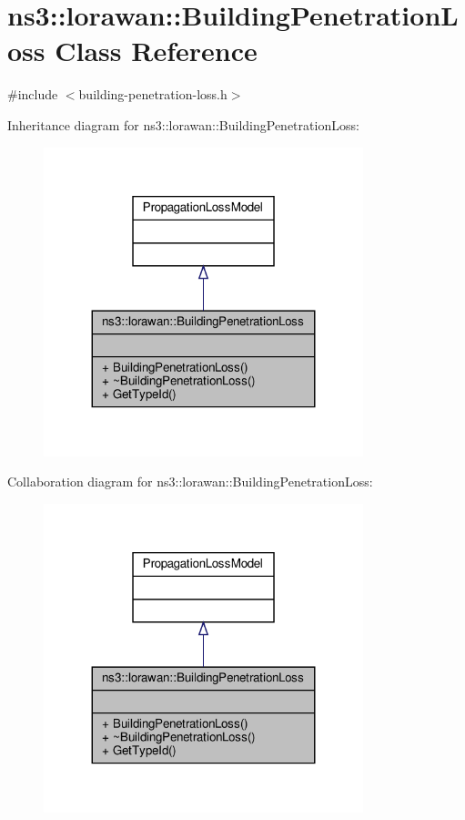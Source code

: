 \hypertarget{classns3_1_1lorawan_1_1BuildingPenetrationLoss}{}\section{ns3\+:\+:lorawan\+:\+:Building\+Penetration\+Loss Class Reference}
\label{classns3_1_1lorawan_1_1BuildingPenetrationLoss}


{\ttfamily \#include $<$building-\/penetration-\/loss.\+h$>$}



Inheritance diagram for ns3\+:\+:lorawan\+:\+:Building\+Penetration\+Loss\+:
\nopagebreak
\begin{figure}[H]
\begin{center}
\leavevmode
\includegraphics[width=263pt]{classns3_1_1lorawan_1_1BuildingPenetrationLoss__inherit__graph}
\end{center}
\end{figure}


Collaboration diagram for ns3\+:\+:lorawan\+:\+:Building\+Penetration\+Loss\+:
\nopagebreak
\begin{figure}[H]
\begin{center}
\leavevmode
\includegraphics[width=263pt]{classns3_1_1lorawan_1_1BuildingPenetrationLoss__coll__graph}
\end{center}
\end{figure}
